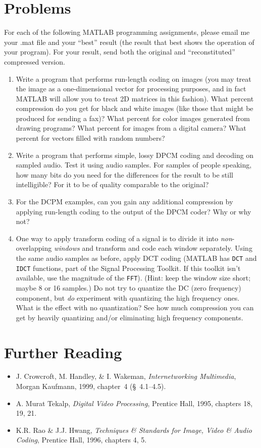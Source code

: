 \section{Problems}

For each of the following MATLAB programming assignments, please email
me your .mat file and your ``best'' result (the result that best shows
the operation of your program). For your result, send both the
original and ``reconstituted'' compressed version.

\begin{enumerate}
\item Write a program that performs run-length coding on images (you
  may treat the image as a one-dimensional vector for processing
  purposes, and in fact MATLAB will allow you to treat 2D matrices in
  this fashion).  What percent compression do you get for black and
  white images (like those that might be produced for sending a fax)?
  What percent for color images generated from drawing programs? What
  percent for images from a digital camera? What percent for vectors
  filled with random numbers?
\item Write a program that performs simple, lossy DPCM coding and
  decoding on sampled audio. Test it using audio samples. For samples
  of people speaking, how many bits do you need for the differences
  for the result to be still intelligible? For it to be of quality
  comparable to the original?
\item For the DCPM examples, can you gain any additional compression
  by applying run-length coding to the output of the DPCM coder? Why
  or why not?
\item One way to apply transform coding of a signal is to divide it
  into \emph{non}-overlapping \emph{windows} and transform and code
  each window separately. Using the same audio samples as before,
  apply DCT coding (MATLAB has \verb|DCT| and \verb|IDCT| functions,
  part of the Signal Processing Toolkit. If this toolkit isn't
  available, use the magnitude of the \verb|FFT|). (Hint: keep the
  window size short; maybe 8 or 16 samples.) Do not try to quantize
  the DC (zero frequency) component, but \emph{do} experiment with
  quantizing the high frequency ones. What is the effect with no
  quantization? See how much compression you can get by heavily
  quantizing and/or eliminating high frequency components.
\end{enumerate}

\section{Further Reading}

\begin{itemize}
\item J. Crowcroft, M. Handley, \& I. Wakeman, \textit{Internetworking
    Multimedia}, Morgan Kaufmann, 1999, chapter~4 (\S\ 4.1--4.5).
\item A. Murat Tekalp, \textit{Digital Video Processing}, Prentice
  Hall, 1995, chapters 18, 19, 21.
\item K.R. Rao \& J.J. Hwang, \textit{Techniques \& Standards for
    Image, Video \& Audio Coding}, Prentice Hall, 1996, chapters 4, 5.
\end{itemize}
